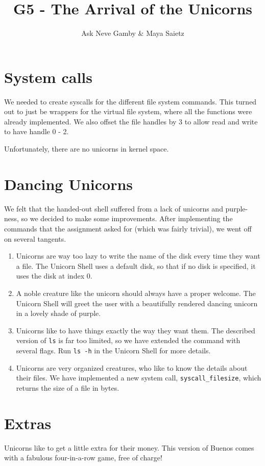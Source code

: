 \documentclass{article}
\title{G5 - The Arrival of the Unicorns}
\author{Ask Neve Gamby \& Maya Saietz}
\begin{document}
\maketitle

\section{System calls}
We needed to create syscalls for the different file system commands. This turned out to just be wrappers for the virtual file system, where all the functions were already implemented. We also offset the file handles by 3 to allow read and write to have handle 0 - 2.

Unfortunately, there are no unicorns in kernel space.

\section{Dancing Unicorns}
We felt that the handed-out shell suffered from a lack of unicorns and purple-ness, so we decided to make some improvements. After implementing the commands that the assignment asked for (which was fairly trivial), we went off on several tangents.

\begin{enumerate}
\item Unicorns are way too lazy to write the name of the disk every time they want a file. The Unicorn Shell uses a default disk, so that if no disk is specified, it uses the disk at index 0.
\item A noble creature like the unicorn should always have a proper welcome. The Unicorn Shell will greet the user with a beautifully rendered dancing unicorn in a lovely shade of purple.
\item Unicorns like to have things exactly the way they want them. The described version of \texttt{ls} is far too limited, so we have extended the command with several flags. Run \texttt{ls -h} in the Unicorn Shell for more details.
\item Unicorns are very organized creatures, who like to know the details about their files. We have implemented a new system call, \texttt{syscall\_filesize}, which returns the size of a file in bytes.
\end{enumerate}

\section{Extras}
Unicorns like to get a little extra for their money. This version of Buenos comes with a fabulous four-in-a-row game, free of charge!
\end{document}
